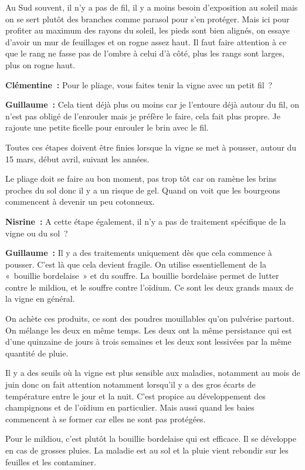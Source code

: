 \documentclass[a4paper, titlepage]{report}
\begin{document}
Au Sud souvent, il n'y a pas de fil, il y a moins besoin d'exposition au
soleil mais on se sert plutôt des branches comme parasol pour s'en
protéger. Mais ici pour profiter au maximum des rayons du soleil, les
pieds sont bien alignés, on essaye d'avoir un mur de feuillages et on
rogne assez haut. Il faut faire attention à ce que le rang ne fasse pas
de l'ombre à celui d'à côté, plus les rangs sont larges, plus on rogne haut.

\textbf{Clémentine~:} Pour le pliage, vous faites tenir la vigne avec un
petit fil~?

\textbf{Guillaume~:} Cela tient déjà plus ou moins car je l'entoure déjà
autour du fil, on n'est pas obligé de l'enrouler mais je préfère le
faire, cela fait plus propre. Je rajoute une petite ficelle pour
enrouler le brin avec le fil.

Toutes ces étapes doivent être finies lorsque la vigne se met à pousser,
autour du 15 mars, début avril, suivant les années.

Le pliage doit se faire au bon moment, pas trop tôt car on ramène les
brins proches du sol donc il y a un risque de gel. Quand on voit que les
bourgeons commencent à devenir un peu cotonneux.

\textbf{Nisrine~:} A cette étape également, il n'y a pas de traitement
spécifique de la vigne ou du sol~?

\textbf{Guillaume~:} Il y a des traitements uniquement dès que cela
commence à pousser. C'est là que cela devient fragile. On utilise
essentiellement de la «~bouillie bordelaise~» et du souffre. La bouillie
bordelaise permet de lutter contre le mildiou, et le souffre contre
l'oïdium. Ce sont les deux grands maux de la vigne en général.

On achète ces produits, ce sont des poudres mouillables qu'on pulvérise
partout. On mélange les deux en même temps. Les deux ont la même
persistance qui est d'une quinzaine de jours à trois semaines et les
deux sont lessivées par la même quantité de pluie.

Il y a des seuils où la vigne est plus sensible aux maladies, notamment
au mois de juin donc on fait attention notamment lorsqu'il y a des gros
écarts de température entre le jour et la nuit. C'est propice au
développement des champignons et de l'oïdium en particulier. Mais aussi
quand les baies commencent à se former car elles ne sont pas protégées.

Pour le mildiou, c'est plutôt la bouillie bordelaise qui est efficace.
Il se développe en cas de grosses pluies. La maladie est au sol et la
pluie vient rebondir sur les feuilles et les contaminer.
\end{document}
